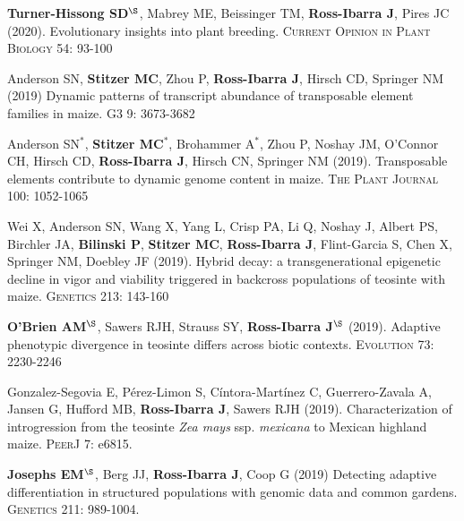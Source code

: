 \documentclass[letterpaper,10pt]{article}
\begin{document}
\begin{etaremune}
\item \textbf{Turner-Hissong SD}$^\S$, Mabrey ME, Beissinger TM, \textbf{Ross-Ibarra J}, Pires JC (2020). Evolutionary insights into plant breeding. \textsc{Current Opinion in Plant Biology} 54: 93-100

\item  Anderson SN, \textbf{Stitzer MC},  Zhou P, \textbf{Ross-Ibarra J}, Hirsch CD, Springer NM (2019) Dynamic patterns of transcript abundance of transposable element families in maize. \textsc{G3} 9: 3673-3682

\item  Anderson SN$^*$, \textbf{Stitzer MC}$^*$,  Brohammer A$^*$, Zhou P, Noshay JM,  O'Connor CH, Hirsch CD, \textbf{Ross-Ibarra J}, Hirsch CN, Springer NM (2019). Transposable elements contribute to dynamic genome content in maize. \textsc{The Plant Journal} 100: 1052-1065

\item Wei X,  Anderson SN,  Wang X,  Yang L, Crisp PA,  Li Q,  Noshay J, Albert PS, Birchler JA,  \textbf{Bilinski P}, \textbf{Stitzer MC}, \textbf{Ross-Ibarra J},  Flint-Garcia S,  Chen X,  Springer NM, Doebley JF (2019). Hybrid decay: a transgenerational epigenetic decline in vigor and viability triggered in backcross populations of teosinte with maize. \textsc{Genetics} 213: 143-160

\item \textbf{O'Brien AM}$^\S$, Sawers RJH, Strauss SY, \textbf{Ross-Ibarra J}$^\S$ (2019). Adaptive phenotypic divergence in teosinte differs across biotic contexts. \textsc{Evolution} 73: 2230-2246

\item  Gonzalez-Segovia E,  P\'erez-Limon S,  C\'intora-Mart\'inez C,  Guerrero-Zavala A,  Jansen G,  Hufford MB, \textbf{Ross-Ibarra J}, Sawers RJH (2019). Characterization of introgression from the teosinte \textit{Zea mays} ssp. \textit{mexicana} to Mexican highland maize. \textsc{PeerJ} 7: e6815. %

\item \textbf{Josephs EM}$^\S$, Berg JJ, \textbf{Ross-Ibarra J}, Coop G (2019) Detecting adaptive differentiation in structured populations with genomic data and common gardens. \textsc{Genetics} 211: 989-1004.


\end{etaremune}
\end{document}
